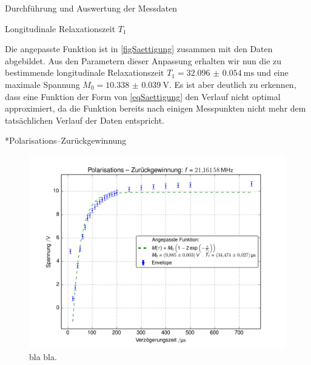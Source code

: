 \documentclass[pdftex, a4paper,11pt, twoside, ngerman]{report}
\begin{document}
\begin{chapter}{Durchführung und Auswertung der Messdaten}
\begin{section}{
        Longitudinale Relaxationszeit $T_{1}$}
\begin{subsection}
        Die angepasste Funktion ist in \cref{figSaettigung} zusammen mit den
        Daten abgebildet.
        Aus den Parametern dieser Anpassung erhalten wir nun die zu bestimmende
        longitudinale Relaxationszeit $T_{1}=\SI{32.096(54)}{\milli\second}$
        und eine maximale Spannung $M_{0}=\SI{10.338(39)}{\volt}$.
        Es ist aber deutlich zu erkennen, dass eine Funktion der Form von
        \cref{eqSaettigung} den Verlauf nicht optimal approximiert, da die
        Funktion bereits nach einigen Messpunkten nicht mehr dem tatsächlichen
        Verlauf der Daten entspricht.
        
        
        
        
      \end{subsection}
      
      
      
      \begin{subsection}*{Polarisations--Zurückgewinnung}
        \label{chpLongRelaxPolarisation}
        
        \begin{figure}[b!]
          \centering
          \includegraphics[width=.9\textwidth]
          {Figures/PolarisationsZurueckgewinnung.png}
          \caption{bla bla.}
          \label{figPolarisation}
        \end{figure}
        

\end{subsection}
\end{section}
\end{chapter}
\end{document}
